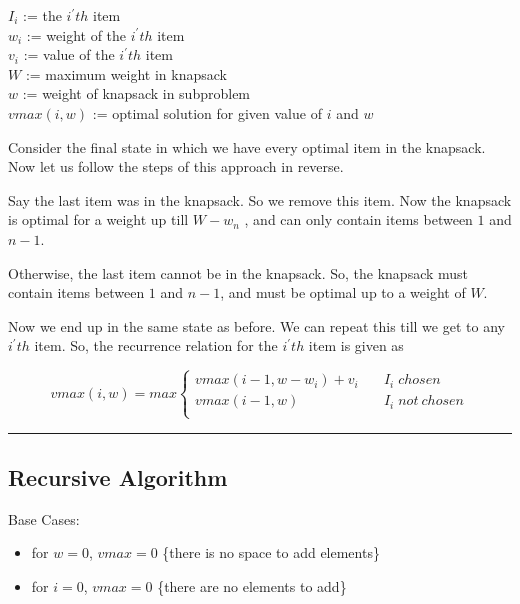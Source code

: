 \documentclass[
]{article}
\providecommand{\tightlist}{%
  \setlength{\itemsep}{0pt}\setlength{\parskip}{0pt}}
\begin{document}
{\(I_{i}\)} := the {\(i^{\prime}th\)} item\\
{\(w_{i}\)} := weight of the {\(i^{\prime}th\)} item\\
{\(v_{i}\)} := value of the {\(i^{\prime}th\)} item\\
{\(W\)} := maximum weight in knapsack\\
{\(w\)} := weight of knapsack in subproblem\\
{\(vmax(i,w)\)} := optimal solution for given value of {\(i\)} and
{\(w\)}

Consider the final state in which we have every optimal item in the
knapsack. Now let us follow the steps of this approach in reverse.

Say the last item was in the knapsack. So we remove this item. Now the
knapsack is optimal for a weight up till {\(W - w_{n}\)} , and can only
contain items between {\(1\)} and {\(n - 1\)}.

Otherwise, the last item cannot be in the knapsack. So, the knapsack
must contain items between {\(1\)} and {\(n - 1\)}, and must be optimal
up to a weight of {\(W\)}.

Now we end up in the same state as before. We can repeat this till we
get to any {\(i^{\prime}th\)} item. So, the recurrence relation for the
{\(i^{\prime}th\)} item is given as

\[vmax(i,w) = max\left\{ \begin{matrix}
{vmax(i - 1,w - w_{i}) + v_{i}} & {\quad I_{i}\; chosen} \\
{vmax(i - 1,w)} & {\quad I_{i}\; not\ chosen} \\
\end{matrix} \right.\]

\begin{center}\rule{0.5\linewidth}{0.5pt}\end{center}

\hypertarget{recursive-algorithm}{%
\subsection{Recursive Algorithm}\label{recursive-algorithm}}

Base Cases:

\begin{itemize}
\tightlist
\item
  for {\(w = 0\)}, {\(vmax = 0\)} \{there is no space to add elements\}
\item
  for {\(i = 0\)}, {\(vmax = 0\)} \{there are no elements to add\}
\end{itemize}
\end{document}
